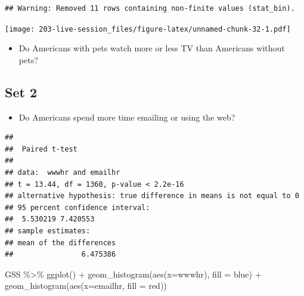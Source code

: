 \documentclass[
]{book}
\newenvironment{Shaded}{\begin{snugshade}}{\end{snugshade}}
\newcommand{\AttributeTok}[1]{\textcolor[rgb]{0.77,0.63,0.00}{#1}}
\newcommand{\ConstantTok}[1]{\textcolor[rgb]{0.00,0.00,0.00}{#1}}
\newcommand{\FunctionTok}[1]{\textcolor[rgb]{0.00,0.00,0.00}{#1}}
\newcommand{\NormalTok}[1]{#1}
\newcommand{\SpecialCharTok}[1]{\textcolor[rgb]{0.00,0.00,0.00}{#1}}
\newcommand{\StringTok}[1]{\textcolor[rgb]{0.31,0.60,0.02}{#1}}
\providecommand{\tightlist}{%
  \setlength{\itemsep}{0pt}\setlength{\parskip}{0pt}}
\theoremstyle{definition}
\theoremstyle{definition}
\theoremstyle{definition}
\theoremstyle{definition}
\theoremstyle{remark}
\begin{document}
\begin{verbatim}
## Warning: Removed 11 rows containing non-finite values (stat_bin).
\end{verbatim}

\texttt{[image: 203-live-session\_files/figure-latex/unnamed-chunk-32-1.pdf]}

\begin{itemize}
\tightlist
\item
  Do Americans with pets watch more or less TV than Americans without pets?
\end{itemize}

\hypertarget{set-2}{%
\subsection{Set 2}\label{set-2}}

\begin{itemize}
\tightlist
\item
  Do Americans spend more time emailing or using the web?
\end{itemize}

\begin{Shaded}
\end{Shaded}

\begin{verbatim}
## 
##  Paired t-test
## 
## data:  wwwhr and emailhr
## t = 13.44, df = 1360, p-value < 2.2e-16
## alternative hypothesis: true difference in means is not equal to 0
## 95 percent confidence interval:
##  5.530219 7.420553
## sample estimates:
## mean of the differences 
##                6.475386
\end{verbatim}

\begin{Shaded}
\begin{Highlighting}[]
\NormalTok{GSS }\SpecialCharTok{\%\textgreater{}\%} 
  \FunctionTok{ggplot}\NormalTok{() }\SpecialCharTok{+} 
  \FunctionTok{geom\_histogram}\NormalTok{(}\FunctionTok{aes}\NormalTok{(}\AttributeTok{x=}\NormalTok{wwwhr), }\AttributeTok{fill =} \StringTok{\textquotesingle{}blue\textquotesingle{}}\NormalTok{) }\SpecialCharTok{+} 
  \FunctionTok{geom\_histogram}\NormalTok{(}\FunctionTok{aes}\NormalTok{(}\AttributeTok{x=}\NormalTok{emailhr, }\AttributeTok{fill =} \StringTok{\textquotesingle{}red\textquotesingle{}}\NormalTok{))}
\end{Highlighting}
\end{Shaded}
\end{document}
